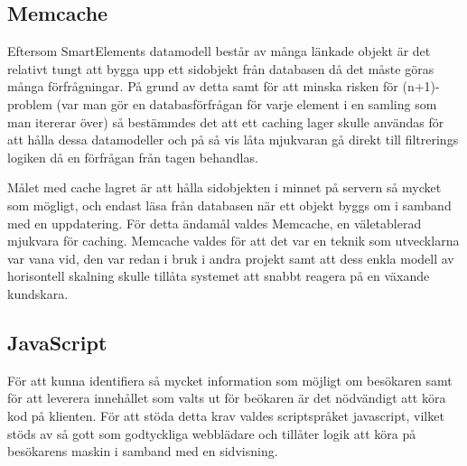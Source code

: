 \subsection{Memcache}

Eftersom SmartElements datamodell består av många länkade objekt är det relativt tungt att bygga upp ett sidobjekt från databasen då det måste göras många förfrågningar. På grund av detta samt för att minska risken för (n+1)-problem (var man gör en databasförfrågan för varje element i en samling som man itererar över) så bestämmdes det att ett caching lager skulle användas för att hålla dessa datamodeller och på så vis låta mjukvaran gå direkt till filtrerings logiken då en förfrågan från tagen behandlas.

Målet med cache lagret är att hålla sidobjekten i minnet på servern så mycket som mögligt, och endast läsa från databasen när ett objekt byggs om i samband med en uppdatering. För detta ändamål valdes Memcache, en väletablerad mjukvara för caching. Memcache valdes för att det var en teknik som utvecklarna var vana vid, den var redan i bruk i andra projekt samt att dess enkla modell av horisontell skalning skulle tillåta systemet att snabbt reagera på en växande kundskara.

\subsection{JavaScript}

För att kunna identifiera så mycket information som möjligt om besökaren samt för att leverera innehållet som valts ut för beökaren är det nödvändigt att köra kod på klienten. För att stöda detta krav valdes scriptspråket javascript, vilket stöds av så gott som godtyckliga webblädare och tillåter logik att köra på besökarens maskin i samband med en sidvisning.

